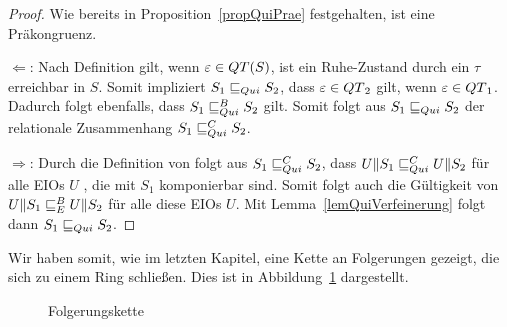 \begin{proof}
  Wie bereits in Proposition~\ref{propQuiPrae} festgehalten, ist \QRel{} eine
  Präkongruenz.

  \glqq{}$\Leftarrow$\grqq{}: Nach Definition gilt, wenn
  $\varepsilon\in QT{}(S)$, ist ein Ruhe-Zustand durch ein $\tau$
  erreichbar in $S$. Somit impliziert $S_1\sqsubseteq _{Qui} S_2$, dass
  $\varepsilon\in QT{}_2$ gilt, wenn $ \varepsilon\in QT{}_1$. Dadurch folgt
  ebenfalls, dass $S_1\sqsubseteq _{Qui}^B S_2$ gilt. Somit folgt aus $S_1\sqsubseteq _{Qui} S_2$ der
  relationale Zusammenhang $S_1\sqsubseteq _{Qui}^C S_2$.

  \glqq{}$\Rightarrow$\grqq{}: Durch die Definition von \QCRel{} folgt aus
  $S_1\sqsubseteq _{Qui}^C{} S_2$, dass $U\|S_1\sqsubseteq _{Qui}^C U\|S_2$ für alle EIOs $U$ , die mit
  $S_1$ komponierbar sind. Somit folgt auch die Gültigkeit von $U\|S_1\sqsubseteq _E^B
  U\|S_2$ für alle diese EIOs $U$. Mit Lemma~\ref{lemQuiVerfeinerung} folgt
  dann $S_1\sqsubseteq _{Qui}{} S_2$.
\end{proof}

Wir haben somit, wie im letzten Kapitel, eine Kette an Folgerungen gezeigt, die
sich zu einem Ring schließen. Dies ist in Abbildung~\ref{FolgerungsketteQui}
dargestellt.

\begin{figure}[h!tbp]
  \begin{center}
    \caption{Folgerungskette}
    \label{FolgerungsketteQui}
  \end{center}
\end{figure}

